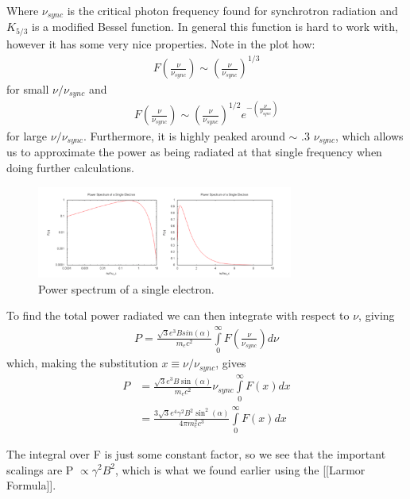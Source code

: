 \documentclass{article}
\begin{document}
Where $\nu_{sync}$ is the critical photon frequency found for synchrotron radiation and $K_{5/3}$ is a modified Bessel function.  In general this function is hard to work with, however it has some very nice properties.  Note in the plot how:
$$\begin{aligned}F\left(\frac{\nu}{\nu_{sync}}\right) \sim \left(\frac{\nu}{\nu_{sync}}\right)^{1/3} 
\end{aligned}$$
for small $\nu/\nu_{sync}$
and 
 $$\begin{aligned} F\left(\frac{\nu}{\nu_{sync}}\right) \sim \left(\frac{\nu}{\nu_{sync}}\right)^{1/2}e^{- \left(\frac{\nu}{\nu_{sync}}\right)}
\end{aligned}$$
for large $\nu/\nu_{sync}$.
Furthermore, it is highly peaked around $\sim$ .3 $\nu_{sync}$, which allows us to approximate
the power as being radiated at that single frequency when doing further calculations.

\begin{figure}
    \centering
    \includegraphics[width=0.75\textwidth]{figures/Screen Shot 2020-11-08 at 8.06.18 PM.png}
    \caption{Power spectrum of a single electron.}
    \label{fig:power_spec}
\end{figure}

To find the total power radiated we can then integrate with respect to $\nu$, giving
 $$\begin{aligned}P = \frac{\sqrt{3}e^3 B sin(\alpha)}{m_e c^2} \int \limits ^{\infty}_{0} F\left(\frac{\nu}{\nu_{sync}}\right) d\nu
\end{aligned}$$
which, making the substitution $x \equiv \nu/\nu_{sync}$, gives
 $$\begin{aligned}P &= \frac{\sqrt{3}e^3 B \sin(\alpha)}{m_e c^2} \nu_{sync} \int \limits ^{\infty}_{0} F\left(x\right) dx \\
 & = \frac{3\sqrt{3}e^4 \gamma^2 B^2 \sin^2(\alpha)}{4 \pi m_e^2 c^3} \int \limits ^{\infty}_{0} F\left(x\right) dx
\end{aligned}$$

The integral over F is just some constant factor, so we see that the important scalings are P $\propto \gamma^2 B^2$, which is what we found earlier using the [[Larmor Formula]].
\end{document}
